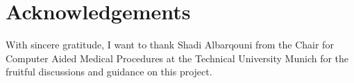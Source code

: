 \section*{Acknowledgements}

With sincere gratitude, I want to thank Shadi Albarqouni from the Chair for
Computer Aided Medical Procedures at the Technical University Munich for the
fruitful discussions and guidance on this project.

